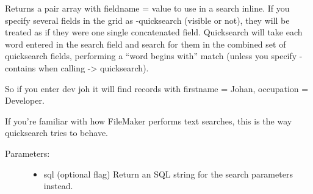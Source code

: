\documentclass[letterpaper,10pt,english]{sphinxmanual}
\begin{document}
\begin{fulllineitems}
\begin{fulllineitems}
\label{knop_grid:knop_grid.qs_id}
\end{fulllineitems}



\begin{fulllineitems}
\end{fulllineitems}


\begin{fulllineitems}
\label{knop_grid:knop_grid.qsr_id}
\end{fulllineitems}



\begin{fulllineitems}
\end{fulllineitems}


\begin{fulllineitems}
\label{knop_grid:knop_grid.quicksearch}
\end{fulllineitems}


\begin{fulllineitems}
Returns a pair array with fieldname = value to use in a search inline. If you
specify several fields in the grid as -quicksearch (visible or not), they will
be treated as if they were one single concatenated field. Quicksearch will take
each word entered in the search field and search for them in the combined set of
quicksearch fields, performing a ``word begins with'' match (unless you specify
-contains when calling -\textgreater{} quicksearch).

So if you enter dev joh it will find records with
firstname = Johan, occupation = Developer.

If you're familiar with how FileMaker performs text searches, this is the way
quicksearch tries to behave.
\begin{description}
\item[{Parameters:}] \leavevmode\begin{itemize}
\item {} 
sql (optional flag)
Return an SQL string for the search parameters instead.


\end{itemize}
\end{description}
\end{fulllineitems}
\end{fulllineitems}
\end{document}
